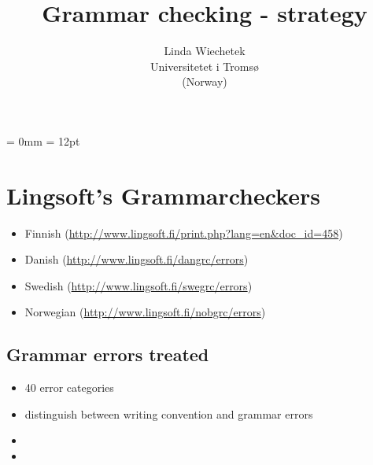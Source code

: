 \documentclass[a4paper,english,12pt]{article}
\begin{document}
\setcounter{secnumdepth}{3}
\setcounter{tocdepth}{3}
\begin{spacing}{1.0}


\newcommand{\tx}{\mbox{t\hspace{-.35em}-}} %
\newcommand{\txx}{\mbox{T\hspace{-.5em}-}} 




\title{{\Large Grammar checking - strategy}}


\author{Linda Wiechetek \\
		Universitetet i Tromsø \\
			(Norway)}
\date{}
\maketitle

\thispagestyle{empty}
\tableofcontents 
\thispagestyle{empty} %

\newpage

\setcounter{page}{1} %

\parindent = 0mm
\parskip = 12pt


\section{Lingsoft's Grammarcheckers}

\begin{itemize}
\item Finnish (\url{http://www.lingsoft.fi/print.php?lang=en&doc_id=458})
\item Danish (\url{http://www.lingsoft.fi/dangrc/errors})
\item Swedish (\url{http://www.lingsoft.fi/swegrc/errors})
\item Norwegian (\url{http://www.lingsoft.fi/nobgrc/errors})
\end{itemize}

\subsection{Grammar errors treated}


\begin{itemize}
\item 40 error categories
\item distinguish between writing convention and grammar errors
\item 
\item 
\end{itemize}


\end{spacing}
\end{document}
